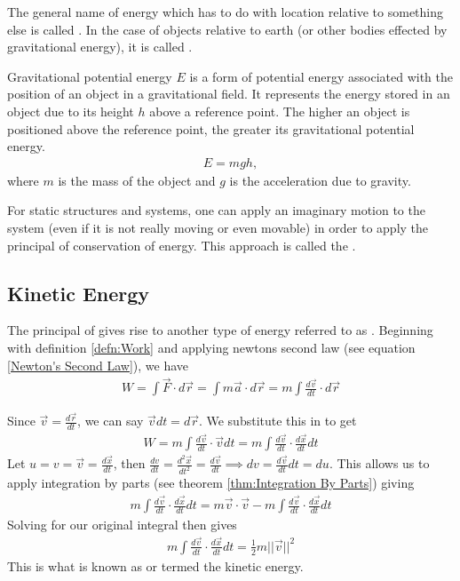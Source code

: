 The general name of energy which has to do with location relative to something else is called . In the case of objects relative to earth (or other bodies effected by gravitational energy), it is called .
	
\begin{defn}
	Gravitational potential energy $E$ is a form of potential energy associated with the position of an object in a gravitational field. It represents the energy stored in an object due to its height $h$ above a reference point. The higher an object is positioned above the reference point, the greater its gravitational potential energy.
	\begin{align}
		E = mgh,
	\end{align}
	where $m$ is the mass of the object and $g$ is the acceleration due to gravity.
\end{defn}

For static structures and systems, one can apply an imaginary motion to the system (even if it is not really moving or even movable) in order to apply the principal of conservation of energy. This approach is called the .

\subsection{Kinetic Energy}


The principal of  gives rise to another type of energy referred to as . Beginning with definition \ref{defn:Work} and applying newtons second law (see equation \ref{Newton's Second Law}), we have
\begin{align}
	W = \int \vec{F}\cdot d\vec{r} = \int m\vec{a}\cdot d\vec{r} = m\int \frac{d\vec{v}}{dt}\cdot d\vec{r}
\end{align}

Since $\vec{v} = \frac{d\vec{r}}{dt}$, we can say $\vec{v} dt = d\vec{r}$. We substitute this in to get
\begin{align}
	W = m\int \frac{d\vec{v}}{dt}\cdot \vec{v} dt = m\int \frac{d\vec{v}}{dt}\cdot \frac{d\vec{x} }{dt}dt
\end{align}
Let $u=v=\vec{v}=\frac{d\vec{x}}{dt}$, then $\frac{dv}{dt} =\frac{d^2\vec{x}}{dt^2} = \frac{d\vec{v} }{dt} \implies dv = \frac{d\vec{v}}{dt}dt = du$. This allows us to apply integration by parts (see theorem \ref{thm:Integration By Parts}) giving
\begin{align}
	m\int \frac{d\vec{v}}{dt}\cdot \frac{d\vec{x} }{dt}dt = m\vec{v}\cdot\vec{v}-m\int \frac{d\vec{v}}{dt}\cdot \frac{d\vec{x} }{dt}dt
\end{align}
Solving for our original integral then gives
\begin{align}
	m\int \frac{d\vec{v}}{dt}\cdot \frac{d\vec{x} }{dt}dt = \frac{1}{2}m||\vec{v}||^2
\end{align}
This is what is known as or termed the kinetic energy.

